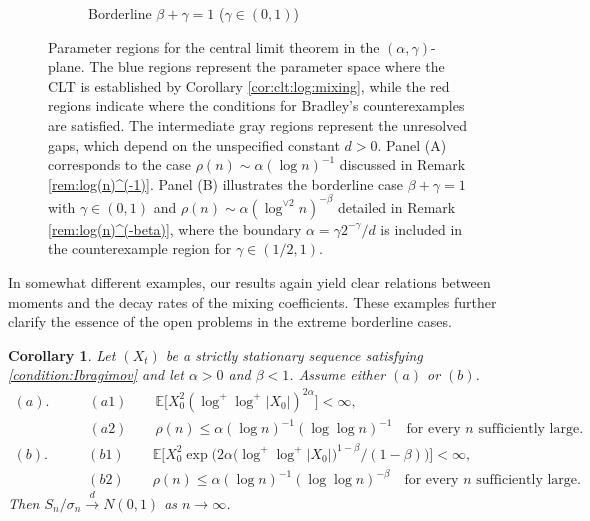 \documentclass[11pt,a4,leqno]{amsart}
\newtheorem{corollary}[lemma]{Corollary}
\newcommand{\E }{{\mathbb E}}
\newcommand{\1}{{\mathbf 1}}
\begin{document}
\begin{figure}[htbp]
\begin{subfigure}[b]{0.49\textwidth}
\caption{Borderline $\beta+\gamma=1$ ($\gamma \in (0, 1)$)}
\end{subfigure}

\caption{Parameter regions for the central limit theorem in the $(\alpha, \gamma)$-plane. The blue regions 
represent the parameter space where the CLT is established by Corollary \ref{cor:clt:log:mixing}, while 
the red regions indicate where the conditions for Bradley's counterexamples are satisfied. The intermediate 
gray regions represent the unresolved gaps, which depend on the unspecified constant $d>0$. 
Panel (A) corresponds to the case $\rho(n) \sim \alpha (\log n)^{-1}$ discussed in Remark \ref{rem:log(n)^(-1)}. 
Panel (B) illustrates the borderline case $\beta + \gamma = 1$ with $\gamma \in (0, 1)$ and 
$\rho(n) \sim \alpha (\log^{\vee 2} n)^{-\beta}$ detailed in Remark \ref{rem:log(n)^(-beta)}, where the boundary 
$\alpha = \gamma 2^{-\gamma}/d$ is included in the counterexample region for $\gamma \in (1/2, 1)$.}
\label{fig:parameter_regions}
\end{figure}



In somewhat different examples, our results again yield clear relations between 
moments and the decay rates of the mixing coefficients. These examples further 
clarify the essence of the open problems in the extreme borderline cases.

\begin{corollary}
\label{cor:clt:new:log:mixing}
Let $(X_t)$ be a strictly stationary sequence satisfying \eqref{condition:Ibragimov} and let $\alpha>0$ and $\beta <1$.
Assume either $(a)$ or $(b)$. 
\begin{align*}
(a). \qquad & (a1)\qquad \E \big[X_0^2 (\log^+ \log^+ |X_0|)^{2\alpha}\big] <\infty, \\
           & (a2)\qquad \rho(n) \le \alpha(\log n)^{-1}(\log \log n)^{-1}\quad \text{for every $n$ sufficiently large}.
\end{align*}
\begin{align*}
(b). \qquad & (b1) \qquad  \E \Big[ X_0^2 \exp\big(
2\alpha \big(\log^+ \log^+ |X_0|\big)^{1-\beta}/(1-\beta)
\big)\Big] <\infty, \\
& (b2) \qquad  \rho(n) \le \alpha (\log n)^{-1}(\log \log n)^{-\beta} \quad \text{for every $n$ sufficiently large}.
\end{align*}
Then $S_n/\sigma_n\stackrel{d}{\to} N(0,1)$ as $n\to\infty$. 
\end{corollary}
\end{document}
